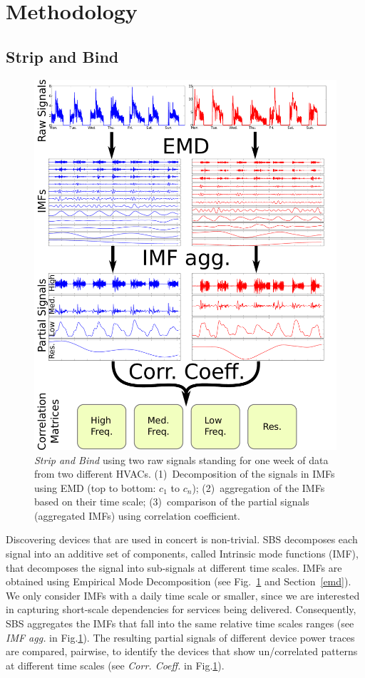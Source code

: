 
\section{Methodology}

\subsection{Strip and Bind} \label{methodo:est}

\begin{figure}[t!]
 \includegraphics[width=.5\textwidth]{img/estimator.pdf}
 \caption{\emph{Strip and Bind} using two raw signals standing for one week of data from two different HVACs. (1)~Decomposition of the signals in IMFs using EMD (top to bottom: $c_1$ to $c_n$); (2)~aggregation of the IMFs based on their time scale; (3)~comparison of the partial signals (aggregated IMFs) using correlation coefficient.}
 \label{fig:diagram1}
\end{figure}

Discovering devices that are used in concert is non-trivial.  
SBS decomposes each signal into an additive set of components, called Intrinsic mode functions (IMF), 
that decomposes the signal into sub-signals at different time scales.  IMFs are obtained using 
Empirical Mode Decomposition (see Fig.~\ref{fig:diagram1} and Section~\ref{emd}).
We only consider IMFs with a daily time scale or smaller, since we are interested in capturing short-scale dependencies
for services being delivered.
Consequently, SBS aggregates the IMFs that fall into the same relative time scales ranges (see \emph{IMF agg.} in Fig.\ref{fig:diagram1}).
The resulting partial signals of different device power traces are compared, pairwise, to identify the devices that show un/correlated patterns at different time scales (see \emph{Corr. Coeff.} in Fig.\ref{fig:diagram1}).


